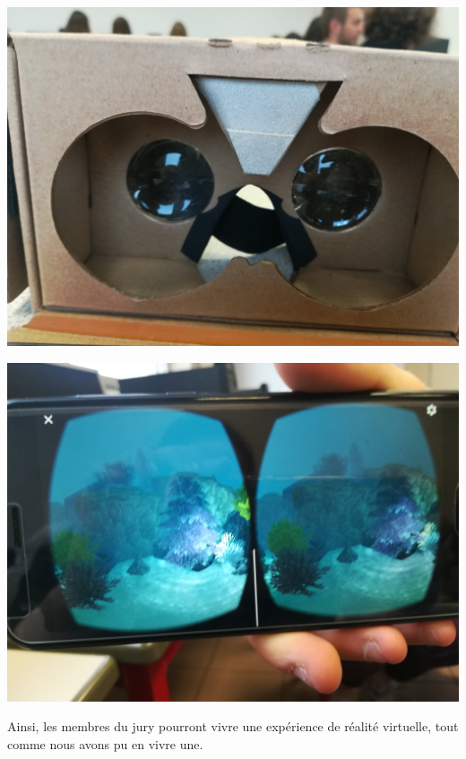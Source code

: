 \documentclass[12pt, a4paper]{report}
\begin{document}
\begin{center}
\includegraphics[scale=0.04]{card.jpg}
\end{center}

\begin{center}
\includegraphics[scale=0.04]{telephone.jpg}
\end{center}

Ainsi, les membres du jury pourront vivre une expérience de réalité virtuelle, tout comme nous avons pu en vivre une.

{\color{white}
\cite{1} \cite{2} \cite{3} \cite{4} \cite{5} \cite{6} \cite{7} \cite{8} \cite{9} \cite{10} \cite{11} \cite{12} \cite{13} \cite{14}
}


\listoffigures{}


\printbibliography{}

\end{document}

